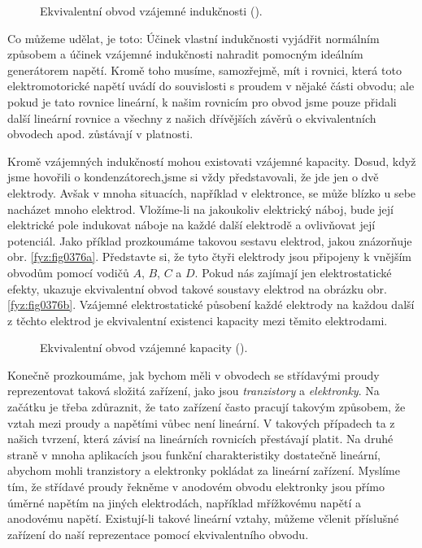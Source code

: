   \begin{figure}[ht!] %
    \centering
    \caption{Ekvivalentní obvod vzájemné indukčnosti
             (\cite[s.~412]{Feynman02}).}
    \label{fyz:fig0375}
  \end{figure}

  Co můžeme udělat, je toto: Účinek vlastní indukčnosti vyjádřit normálním způsobem a účinek 
  vzájemné indukčnosti nahradit pomocným ideálním generátorem napětí. Kromě toho musíme, 
  samozřejmě, mít i rovnici, která toto elektromotorické napětí uvádí do souvislosti s proudem v 
  nějaké části obvodu; ale pokud je tato rovnice lineární, k našim rovnicím pro obvod jsme pouze 
  přidali další lineární rovnice a všechny z našich dřívějších závěrů o ekvivalentních obvodech 
  apod. zůstávají v platnosti. 

  Kromě vzájemných indukčností mohou existovati vzájemné kapacity. Dosud, když jsme hovořili o 
  kondenzátorech,jsme si vždy představovali, že jde jen o dvě elektrody. Avšak v mnoha situacích, 
  například v elektronce, se může blízko u sebe nacházet mnoho elektrod. Vložíme-li na jakoukoliv 
  elektrický náboj, bude její elektrické pole indukovat náboje na každé další elektrodě a 
  ovlivňovat její potenciál. Jako příklad prozkoumáme takovou sestavu elektrod, jakou znázorňuje 
  obr. \ref{fyz:fig0376a}. Představte si, že tyto čtyři elektrody jsou připojeny k vnějším obvodům 
  pomocí vodičů \(A\), \(B\), \(C\) a \(D\). Pokud nás zajímají jen elektrostatické efekty, ukazuje 
  ekvivalentní obvod takové soustavy elektrod na obrázku obr. \ref{fyz:fig0376b}. Vzájemné 
  elektrostatické působení každé elektrody na každou další z těchto elektrod je ekvivalentní 
  existenci kapacity mezi těmito elektrodami.
  
  \begin{figure}[ht!] %
    \centering
    \caption{Ekvivalentní obvod vzájemné kapacity
             (\cite[s.~415]{Feynman02}).}
    \label{fyz:fig0376}
  \end{figure}

  Konečně prozkoumáme, jak bychom měli v obvodech se střídavými proudy reprezentovat taková složitá 
  zařízení, jako jsou \emph{tranzistory} a \emph{elektronky}. Na začátku je třeba zdůraznit, že 
  tato zařízení často pracují takovým způsobem, že vztah mezi proudy a napětími vůbec není 
  lineární. V takových případech ta z našich tvrzení, která závisí na lineárních rovnicích 
  přestávají platit. Na druhé straně v mnoha aplikacích jsou funkční charakteristiky dostatečně 
  lineární, abychom mohli tranzistory a elektronky pokládat za lineární zařízení. Myslíme tím, že 
  střídavé proudy řekněme v anodovém obvodu elektronky jsou přímo úměrné napětím na jiných 
  elektrodách, například mřížkovému napětí a anodovému napětí. Existují-li takové lineární vztahy, 
  můžeme včlenit příslušné zařízení do naší reprezentace pomocí ekvivalentního obvodu.

